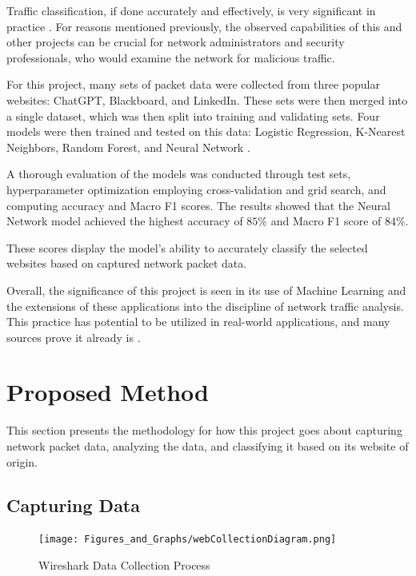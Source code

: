 \documentclass[10pt,sigconf,letterpaper,nonacm]{acmart}
\begin{document}
Traffic classification, if done accurately and effectively, is very significant in practice \cite{10.1109/TNET.2014.2320577}. For reasons mentioned previously, the observed capabilities of this and other projects 
can be crucial for network administrators and security professionals, who would examine the network for malicious traffic.

For this project, many sets of packet data were collected from three popular websites: ChatGPT, Blackboard, and 
LinkedIn. These sets were then merged into a single dataset, which was then split into training and validating sets. 
Four models were then trained and tested on this data: Logistic Regression, K-Nearest Neighbors, Random Forest, and Neural Network \cite{scikit-learn}. 

A thorough evaluation of the models was conducted through test sets, hyperparameter optimization employing cross-validation and grid search, and computing accuracy and Macro F1 scores. The results showed that the Neural Network model 
achieved the highest accuracy of $85\%$ and Macro F1 score of 84\%.

These scores display the model's ability to accurately classify the selected websites based on captured network packet data.

Overall, the significance of this project is seen in its use of Machine Learning and the extensions of these applications into the discipline of network traffic analysis. This practice has potential to be utilized in real-world applications, and many sources
prove it already is \cite{10.5555/3432601.3432608}. 

\section{Proposed Method}
This section presents the methodology for how this project goes about capturing network packet data, analyzing the data, and classifying it based on its website of origin.

\subsection{Capturing Data}

\begin{figure}[t]
  \centering
  \texttt{[image: Figures\_and\_Graphs/webCollectionDiagram.png]}
  \caption{Wireshark Data Collection Process}
  \label{fig:dataCollection}
\end{figure}
\end{document}
